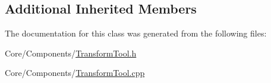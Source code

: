 \subsection*{Additional Inherited Members}


The documentation for this class was generated from the following files\-:\begin{DoxyCompactItemize}
\item 
Core/\-Components/\hyperlink{TransformTool_8h}{Transform\-Tool.\-h}\item 
Core/\-Components/\hyperlink{TransformTool_8cpp}{Transform\-Tool.\-cpp}\end{DoxyCompactItemize}
